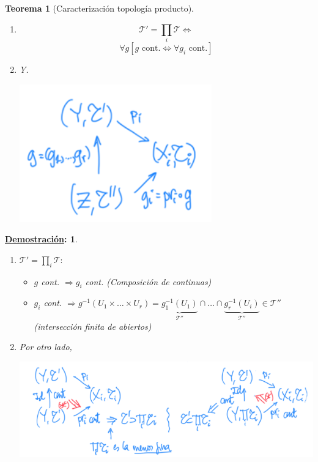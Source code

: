 \documentclass[10pt,a4paper,openright]{book}
\theoremstyle{break}
\newtheorem*{theo}{Teorema}
\newtheorem*{demo}{\underline{Demostración}:}
\begin{document}
\begin{theo}[Caracterización topología producto]
\begin{enumerate}
    \item
    \[
    \mathcal{T}' = \prod_{i} \mathcal{T} \Leftrightarrow  
    \]
    \begin{equation}
        \forall g \left[ g \text{ cont.} \Leftrightarrow \forall g_i \text{ cont.} \right]
    \end{equation}

    \item Y.
    \begin{center}
        \includegraphics[scale=0.3]{images/caracterizacion_top_prod} 
    \end{center}
\end{enumerate}
\end{theo}
\begin{demo}
\begin{enumerate}
    \item $\mathcal{T}' = \prod_{i} \mathcal{T}: $ 
    \begin{itemize}
        \item $g$ cont. $\Rightarrow g_i$ cont. (Composición de continuas)
        \item $g_i$ cont. $\Rightarrow g^{-1}\left( U_1 \times \ldots \times U_r \right) = \underbrace{g_1^{-1}\left( U_1 \right)}_{\mathcal{T}''} \cap \ldots \cap \underbrace{g_r^{-1}\left( U_i \right)}_{\mathcal{T}''} \in \mathcal{T}''$ (intersección finita de abiertos) 
    \end{itemize}

    \item Por otro lado,
    \begin{center}
        \includegraphics[scale=0.4]{images/dem_carac_top_prod} 
    \end{center}
\end{enumerate}
\end{demo}
\end{document}
